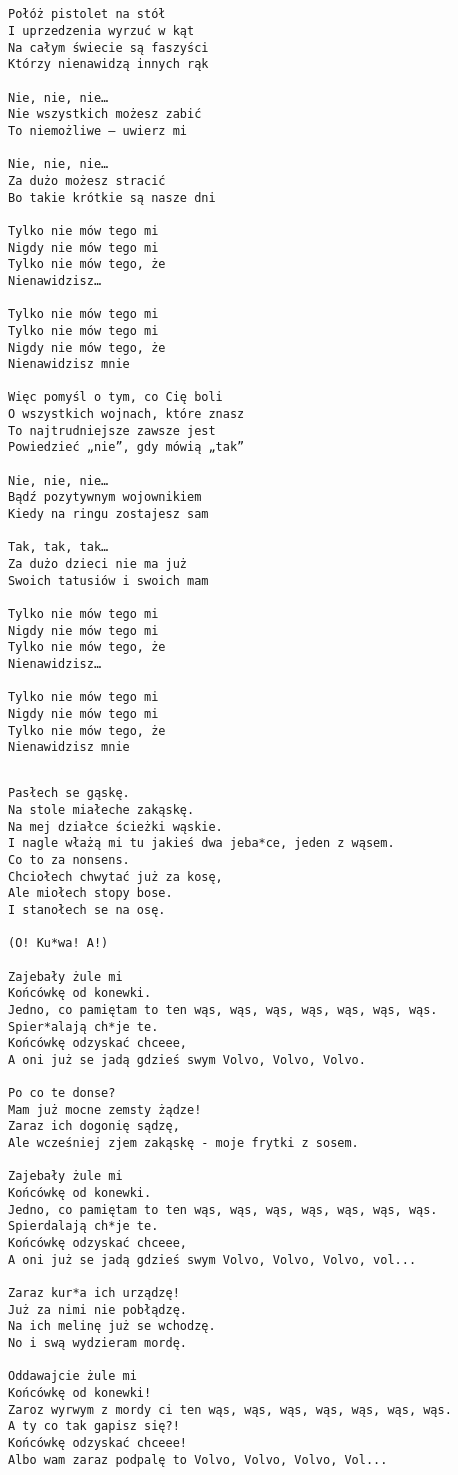 \documentclass[12pt]{article}
\begin{document}
\subsection*{}
\begin{verbatim}
Połóż pistolet na stół
I uprzedzenia wyrzuć w kąt
Na całym świecie są faszyści
Którzy nienawidzą innych rąk

Nie, nie, nie…
Nie wszystkich możesz zabić
To niemożliwe – uwierz mi

Nie, nie, nie…
Za dużo możesz stracić
Bo takie krótkie są nasze dni

Tylko nie mów tego mi
Nigdy nie mów tego mi
Tylko nie mów tego, że
Nienawidzisz…

Tylko nie mów tego mi
Tylko nie mów tego mi
Nigdy nie mów tego, że
Nienawidzisz mnie

Więc pomyśl o tym, co Cię boli
O wszystkich wojnach, które znasz
To najtrudniejsze zawsze jest
Powiedzieć „nie”, gdy mówią „tak”

Nie, nie, nie…
Bądź pozytywnym wojownikiem
Kiedy na ringu zostajesz sam

Tak, tak, tak…
Za dużo dzieci nie ma już
Swoich tatusiów i swoich mam

Tylko nie mów tego mi
Nigdy nie mów tego mi
Tylko nie mów tego, że
Nienawidzisz…

Tylko nie mów tego mi
Nigdy nie mów tego mi
Tylko nie mów tego, że
Nienawidzisz mnie
\end{verbatim}
\clearpage

\subsection*{}
\begin{verbatim}
Pasłech se gąskę.
Na stole miałeche zakąskę.
Na mej działce ścieżki wąskie.
I nagle włażą mi tu jakieś dwa jeba*ce, jeden z wąsem.
Co to za nonsens.
Chciołech chwytać już za kosę,
Ale miołech stopy bose.
I stanołech se na osę.

(O! Ku*wa! A!)

Zajebały żule mi
Końcówkę od konewki.
Jedno, co pamiętam to ten wąs, wąs, wąs, wąs, wąs, wąs, wąs.
Spier*alają ch*je te.
Końcówkę odzyskać chceee,
A oni już se jadą gdzieś swym Volvo, Volvo, Volvo.

Po co te donse?
Mam już mocne zemsty żądze!
Zaraz ich dogonię sądzę,
Ale wcześniej zjem zakąskę - moje frytki z sosem.

Zajebały żule mi
Końcówkę od konewki.
Jedno, co pamiętam to ten wąs, wąs, wąs, wąs, wąs, wąs, wąs.
Spierdalają ch*je te.
Końcówkę odzyskać chceee,
A oni już se jadą gdzieś swym Volvo, Volvo, Volvo, vol...

Zaraz kur*a ich urządzę!
Już za nimi nie pobłądzę.
Na ich melinę już se wchodzę.
No i swą wydzieram mordę.

Oddawajcie żule mi
Końcówkę od konewki!
Zaroz wyrwym z mordy ci ten wąs, wąs, wąs, wąs, wąs, wąs, wąs.
A ty co tak gapisz się?!
Końcówkę odzyskać chceee!
Albo wam zaraz podpalę to Volvo, Volvo, Volvo, Vol...
\end{verbatim}
\clearpage
\end{document}
